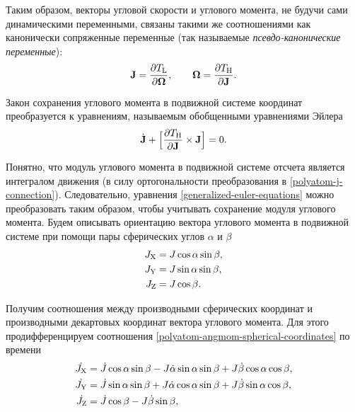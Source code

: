 Таким образом, векторы угловой скорости и углового момента, не будучи сами динамическими переменными, связаны такими же соотношениями как канонически сопряженные переменные (так называемые \textit{псевдо-канонические переменные}):
\begin{gather}
    \mathbf{J} = \frac{\partial T_\text{L}}{\partial \boldsymbol{\Omega}}, \qquad \boldsymbol{\Omega} = \frac{\partial T_\text{H}}{\partial \mathbf{J}}.
\end{gather}

Закон сохранения углового момента в подвижной системе координат преобразуется к уравнениям, называемым обобщенными уравнениями Эйлера \cite{petrov2015}
\begin{gather}
    \dot{\mathbf{J}} + \Big[ \frac{\partial T_\text{H}}{\partial \mathbf{J}} \times \mathbf{J} \Big] = 0. \label{generalized-euler-equations}
\end{gather}

Понятно, что модуль углового момента в подвижной системе отсчета является интегралом движения (в силу ортогональности преобразования в \eqref{polyatom-j-connection}). Следовательно, уравнения \eqref{generalized-euler-equations} можно преобразовать таким образом, чтобы учитывать сохранение модуля углового момента. Будем описывать ориентацию вектора углового момента в подвижной системе при помощи пары сферических углов $\alpha$ и $\beta$
\begin{gather}
    \begin{aligned}
        J_\text{X} &= J \cos \alpha \sin \beta, \\
        J_\text{Y} &= J \sin \alpha \sin \beta, \\
        J_\text{Z} &= J \cos \beta.
    \end{aligned} \label{polyatom-angmom-spherical-coordinates}
\end{gather}

Получим соотношения между производными сферических координат и производными декартовых координат вектора углового момента. Для этого продифференцируем соотношения \eqref{polyatom-angmom-spherical-coordinates} по времени 
\begin{gather}
    \begin{aligned}
        \dot{J_\text{X}} &= \dot{J} \cos \alpha \sin \beta - J \dot{\alpha} \sin \alpha \sin \beta + J \dot{\beta} \cos \alpha \cos \beta, \\
        \dot{J_\text{Y}} &= \dot{J} \sin \alpha \sin \beta + J \dot{\alpha} \cos \alpha \sin \beta + J \dot{\beta} \sin \alpha \cos \beta, \\
        \dot{J_\text{Z}} &= \dot{J} \cos \beta - J \dot{\beta} \sin \beta,
    \end{aligned}
\end{gather}

